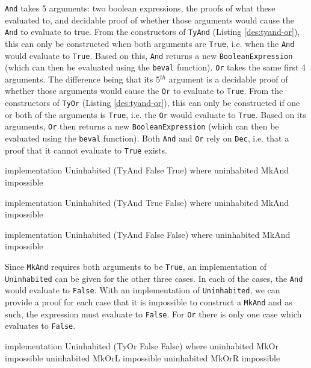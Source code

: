     \texttt{And} takes 5 arguments: two boolean expressions, the proofs of what these evaluated to, and decidable proof of whether those arguments would cause the \texttt{And} to evaluate to true. From the constructors of \texttt{TyAnd} (Listing \ref{des:tyand-or}), this can only be constructed when both arguments are \texttt{True}, i.e. when the \texttt{And} would evaluate to \texttt{True}. Based on this, \texttt{And} returns a new \texttt{BooleanExpression} (which can then be evaluated using the \texttt{beval} function). \texttt{Or} takes the same first 4 arguments. The difference being that its 5$^{th}$ argument is a decidable proof of whether those arguments would cause the \texttt{Or} to evaluate to \texttt{True}. From the constructors of \texttt{TyOr} (Listing \ref{des:tyand-or}), this can only be constructed if one or both of the arguments is \texttt{True}, i.e. the \texttt{Or} would evaluate to \texttt{True}. Based on its arguments, \texttt{Or} then returns a new \texttt{BooleanExpression} (which can then be evaluated using the \texttt{beval} function). Both \texttt{And} and \texttt{Or} rely on \texttt{Dec}, i.e. that a proof that it cannot evaluate to \texttt{True} exists.
    
    \begin{code}[caption={Impossible \texttt{And} cases}]
        implementation Uninhabited (TyAnd False True) where
            uninhabited MkAnd impossible
            
        implementation Uninhabited (TyAnd True False) where
            uninhabited MkAnd impossible
            
        implementation Uninhabited (TyAnd False False) where
            uninhabited MkAnd impossible
    \end{code}

    Since \texttt{MkAnd} requires both arguments to be \texttt{True}, an implementation of \texttt{Uninhabited} can be given for the other three cases. In each of the cases, the \texttt{And} would evaluate to \texttt{False}. With an implementation of \texttt{Uninhabited}, we can provide a proof for each case that it is impossible to construct a \texttt{MkAnd} and as such, the expression must evaluate to \texttt{False}. For \texttt{Or} there is only one case which evaluates to \texttt{False}.
    
    \begin{code}[caption={The impossible \texttt{Or} case}]
        implementation Uninhabited (TyOr False False) where
            uninhabited MkOr  impossible
            uninhabited MkOrL impossible
            uninhabited MkOrR impossible
    \end{code}

